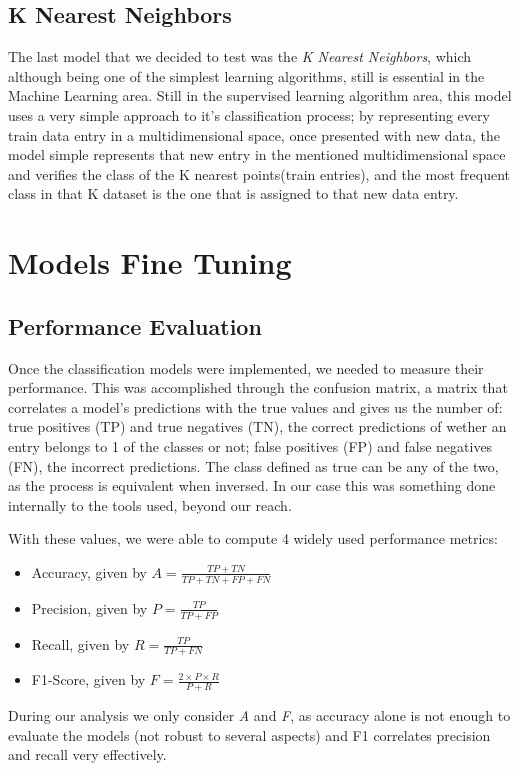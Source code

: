 \documentclass[conference]{IEEEtran}
\begin{document}
\subsection{K Nearest Neighbors}
The last model that we decided to test was the \textit{K Nearest Neighbors}, which although being one of the simplest learning algorithms, still is essential in the Machine Learning area. Still in the supervised learning algorithm area, this model uses a very simple approach to it's classification process; by representing every train data entry in a multidimensional space, once presented with new data, the model simple represents that new entry in the mentioned multidimensional space and verifies the class of the K nearest points(train entries), and the most frequent class in that K dataset is the one that is assigned to that new data entry. 

\section{Models Fine Tuning}\label{parameters}

\subsection{Performance Evaluation}

Once the classification models were implemented, we needed to measure their 
performance.
This was accomplished through the confusion matrix, a matrix that correlates 
a model's predictions with the true values and gives us the number of: true 
positives (TP) and true negatives (TN), the correct predictions of wether an 
entry belongs to 1 of the classes or not; false positives (FP) and false negatives (FN), the 
incorrect predictions.
The class defined as true can be any of the two, as the process is equivalent 
when inversed.
In our case this was something done internally to the tools used, beyond our 
reach.

With these values, we were able to compute 4 widely used performance metrics:
\begin{itemize}
\item Accuracy, given by $A = \frac{TP + TN}{TP + TN + FP + FN}$
\vspace{3pt}
\item Precision, given by $P = \frac{TP}{TP + FP}$
\vspace{3pt}
\item Recall, given by $R = \frac{TP}{TP + FN}$
\vspace{3pt}
\item F1-Score, given by $F = \frac{2 \times P \times R}{P + R}$
\vspace{3pt}
\end{itemize}
During our analysis we only consider \textit{A} and \textit{F}, as accuracy alone 
is not enough to evaluate the models (not robust to several aspects) and F1 
correlates precision and recall very effectively.
\end{document}
